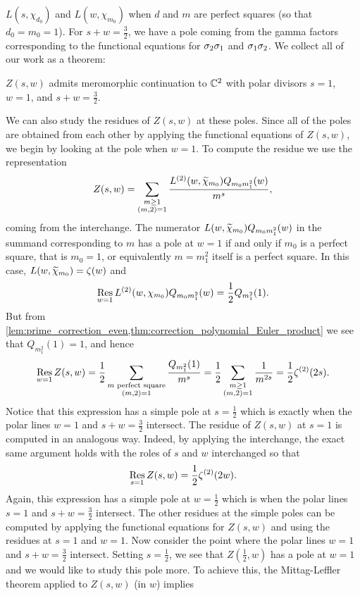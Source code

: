 \documentclass[12pt,reqno,oneside]{amsart}
\begin{document}
$L(s,\chi_{d_{0}})$ and $L(w,\chi_{m_{0}})$ when $d$ and $m$ are perfect squares (so that $d_{0} = m_{0} = 1$). For $s+w = \frac{3}{2}$, we have a pole coming from the gamma factors corresponding to the functional equations for $\sigma_{2}\sigma_{1}$ and $\sigma_{1}\sigma_{2}$. We collect all of our work as a theorem:

    \begin{theorem}
        $Z(s,w)$ admits meromorphic continuation to $\mathbb{C}^{2}$ with polar divisors $s = 1$, $w = 1$, and $s+w = \frac{3}{2}$.
    \end{theorem}

    We can also study the residues of $Z(s,w)$ at these poles. Since all of the poles are obtained from each other by applying the functional equations of $Z(s,w)$, we begin by looking at the pole when $w = 1$. To compute the residue we use the representation
    \[
        Z(s,w) = \sum_{\substack{m \ge 1 \\ (m,2) = 1}}\frac{L^{(2)}(w,\widetilde{\chi}_{m_{0}})Q_{m_{0}m_{1}^{2}}(w)}{m^{s}},
    \]
    coming from the interchange. The numerator $L(w,\widetilde{\chi}_{m_{0}})Q_{m_{0}m_{1}^{2}}(w)$ in the summand corresponding to $m$ has a pole at $w = 1$ if and only if $m_{0}$ is a perfect square, that is $m_{0} = 1$, or equivalently $m = m_{1}^{2}$ itself is a perfect square. In this case, $L(w,\widetilde{\chi}_{m_{0}}) = \zeta(w)$ and
    \[
        \operatorname*{\mathrm{Res}}_{w = 1}L^{(2)}(w,\chi_{m_{0}})Q_{m_{0}m_{1}^{2}}(w) = \frac{1}{2}Q_{m_{1}^{2}}(1).
    \]
    But from \cref{lem:prime_correction_even,thm:correction_polynomial_Euler_product} we see that $Q_{m_{1}^{2}}(1) = 1$, and hence
    \[
        \operatorname*{\mathrm{Res}}_{w = 1}Z(s,w) = \frac{1}{2}\sum_{\substack{\text{$m$ perfect square} \\ (m,2) = 1}}\frac{Q_{m_{1}^{2}}(1)}{m^{s}} = \frac{1}{2}\sum_{\substack{m \ge 1 \\ (m,2) = 1}}\frac{1}{m^{2s}} = \frac{1}{2}\zeta^{(2)}(2s).
    \]
    Notice that this expression has a simple pole at $s = \frac{1}{2}$ which is exactly when the polar lines $w = 1$ and $s+w = \frac{3}{2}$ intersect. The residue of $Z(s,w)$ at $s = 1$ is computed in an analogous way. Indeed, by applying the interchange, the exact same argument holds with the roles of $s$ and $w$ interchanged so that
    \[
        \operatorname*{\mathrm{Res}}_{s = 1}Z(s,w) = \frac{1}{2}\zeta^{(2)}(2w).
    \]
    Again, this expression has a simple pole at $w = \frac{1}{2}$ which is when the polar lines $s = 1$ and $s+w = \frac{3}{2}$ intersect. The other residues at the simple poles can be computed by applying the functional equations for $Z(s,w)$ and using the residues at $s = 1$ and $w = 1$. Now consider the point where the polar lines $w = 1$ and $s+w = \frac{3}{2}$ intersect. Setting $s = \frac{1}{2}$, we see that $Z\left(\frac{1}{2},w\right)$ has a pole at $w= 1$ and we would like to study this pole more. To achieve this, the Mittag-Leffler theorem applied to $Z(s,w)$ (in $w$) implies
\end{document}
